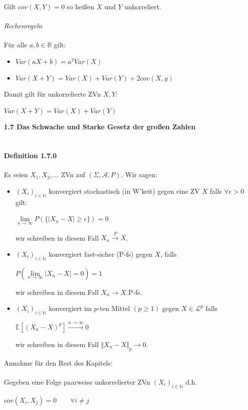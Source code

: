 \documentclass[10pt,a4paper]{report}
\numberwithin{equation}{section}
\numberwithin{figure}{section}
\theoremstyle{plain}
\theoremstyle{definition}
\theoremstyle{plain}
\theoremstyle{definition}
\theoremstyle{remark}
\theoremstyle{plain}
\begin{document}
Gilt $cov(X,Y)=0$ so heißen $X$ und $Y$ unkorreliert.\\\\
\textit{Rechenregeln}\\\\
Für alle $a,b \in \mathbb{R}$ gilt:
\begin{itemize}
\item $Var(aX+b)=a^2Var(X)$
\item $Var(X+Y)=Var(X)+Var(Y)+2cov(X,y)$
\end{itemize}
Damit gilt für unkorrelierte ZVn $X,Y$:
\begin{center}
$Var(X+Y)=Var(X)+Var(Y)$
\end{center} 
\Large{\textbf{1.7 Das Schwache und Starke Gesetz der großen Zahlen}}\normalsize\\\\\\
\textbf{Definition 1.7.0}\\\\
Es seien $X_1,X_2,\ldots$ ZVn auf $(\Sigma,\mathcal{A},P)$. Wir sagen:
\begin{itemize}
\item $(X_i)_{i \in \mathbb{N}}$ konvergiert stochastisch (in W'keit) gegen eine ZV $X$ falls $\forall\epsilon >0$ gilt:
\begin{center}
$\lim\limits_{n \to \infty}P(\{|X_n-X|\geq \epsilon\})=0$
\end{center}
wir schreiben in diesem Fall $X_n \overset{P}{\to} X$.
\item $(X_i)_{i \in \mathbb{N}}$ konvergiert fast-sicher (P-fs) gegen $X$, falls 
\begin{center}
$P\left(\lim\limits_{n \to \infty}|X_n-X|=0\right)=1$
\end{center}
wir schreiben in diesem Fall $X_n \to X$ P-fs.
\item $(X_i)_{i \in \mathbb{N}}$ konvergiert im $p$-ten Mittel $(p\geq 1)$ gegen $X \in \mathcal{L}^p$ falls
\begin{center}
$\mathbb{E}[(X_n-X)^p] \overset{n \to \infty}{\to}0$
\end{center} 
wir schreiben in diesem Fall $\Vert X_n-X\Vert_p \to 0$.\\
\end{itemize}
Annahme für den Rest des Kapitels:\\\\
Gegeben eine Folge paarweise unkorrelierter ZVn $(X_i)_{i \in \mathbb{N}}$ d.h.
\begin{center}
$cov(X_i,X_j)=0 \qquad \forall i\neq j$
\end{center}
\end{document}
